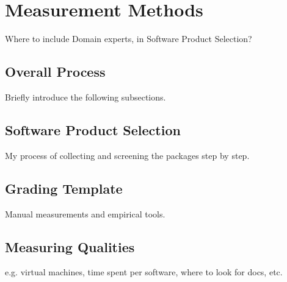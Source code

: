 \chapter{Measurement Methods}
\label{ch_methods}

Where to include Domain experts, in Software Product Selection?

\section{Overall Process}

Briefly introduce the following subsections.

\section{Software Product Selection}

My process of collecting and screening the packages step by step.

\section{Grading Template}

Manual measurements and empirical tools.

\section{Measuring Qualities}

e.g. virtual machines, time spent per software, where to look for docs, etc.
